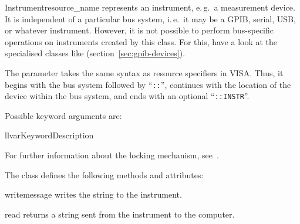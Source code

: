 \documentclass{howto}
\begin{document}
\begin{classdesc}{Instrument}{resource_name}
  represents an instrument, e.\,g.\ a measurement device.  It is independent of
  a particular bus system, i.\,e.\ it may be a GPIB, serial, USB, or whatever
  instrument.  However, it is not possible to perform bus-specific operations
  on instruments created by this class.  For this, have a look at the
  specialised classes like 
  (section~\ref{sec:gpib-devices}).

  The parameter  takes the same syntax as resource
  specifiers in VISA\@.  Thus, it begins with the bus system followed by
  ``\verb|::|'', continues with the location of the device within the bus
  system, and ends with an optional ``\verb|::INSTR|''.

  Possible keyword arguments are:
  \begin{tableii}{ll}{var}{Keyword}{Description}
  \end{tableii}

  \vspace{1ex}
  For further information about the locking mechanism,
  see~.
\end{classdesc}

The class  defines the following methods and attributes:

\begin{methoddesc}{write}{message}
  writes the string  to the instrument.
\end{methoddesc}

\begin{methoddesc}{read}{}
  returns a string sent from the instrument to the computer.
\end{methoddesc}
\end{document}
